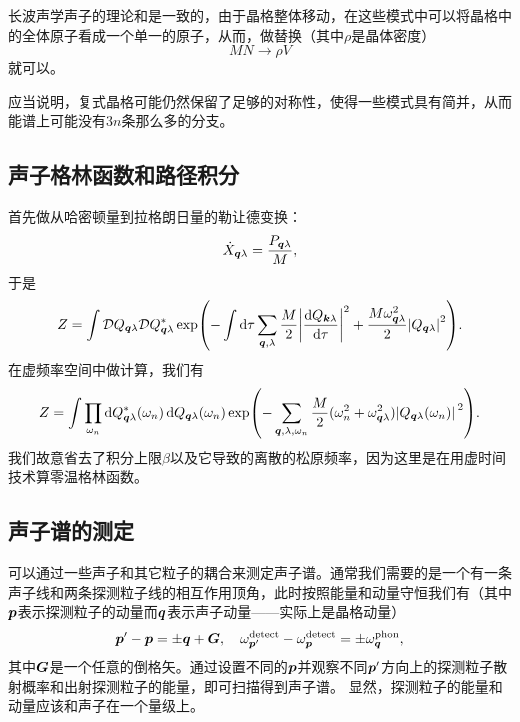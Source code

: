 长波声学声子的理论和是一致的，由于晶格整体移动，在这些模式中可以将晶格中的全体原子看成一个单一的原子，从而，做替换（其中$\rho$是晶体密度）
\begin{equation}
    MN \longrightarrow \rho V
\end{equation}
就可以。

应当说明，复式晶格可能仍然保留了足够的对称性，使得一些模式具有简并，从而能谱上可能没有$3n$条那么多的分支。

\subsection{声子格林函数和路径积分}

首先做从哈密顿量到拉格朗日量的勒让德变换：
\[
    \dot{X}_{\vb*{q} \lambda} = \frac{P_{\vb*{q} \lambda}}{M},
\]
于是
\begin{equation}
    Z = \int \mathcal{D} Q_{\vb*{q} \lambda} \mathcal{D} Q^*_{\vb*{q} \lambda} \exp(- \int \dd{\tau} \sum_{\vb*{q}, \lambda} \frac{M}{2} \abs{\dv{Q_{\vb*{k} \lambda}}{\tau}}^2 + \frac{M \omega_{\vb*{q} \lambda}^2}{2} \abs{Q_{\vb*{q} \lambda}}^2 ).
\end{equation}
在虚频率空间中做计算，我们有
\begin{equation}
    Z = \int \prod_{\omega_n} \dd{Q_{\vb*{q} \lambda}^*(\omega_n)} \dd{Q_{\vb*{q} \lambda}(\omega_n)} \exp(- \sum_{\vb*{q}, \lambda, \omega_n} \frac{M}{2} (\omega_n^2 + \omega_{\vb*{q} \lambda}^2) \abs*{Q_{\vb*{q} \lambda}(\omega_n)}^2).
\end{equation}
我们故意省去了积分上限$\beta$以及它导致的离散的松原频率，因为这里是在用虚时间技术算零温格林函数。

\subsection{声子谱的测定}

可以通过一些声子和其它粒子的耦合来测定声子谱。通常我们需要的是一个有一条声子线和两条探测粒子线的相互作用顶角，此时按照能量和动量守恒我们有（其中$\vb*{p}$表示探测粒子的动量而$\vb*{q}$表示声子动量——实际上是晶格动量）
\begin{equation}
    \vb*{p}' - \vb*{p} = \pm \vb*{q} + \vb*{G}, \quad \omega^\text{detect}_{\vb*{p}'} - \omega^\text{detect}_{\vb*{p}} = \pm \omega^\text{phon}_{\vb*{q}},
\end{equation}
其中$\vb*{G}$是一个任意的倒格矢。通过设置不同的$\vb*{p}$并观察不同$\vb*{p}'$方向上的探测粒子散射概率和出射探测粒子的能量，即可扫描得到声子谱。
显然，探测粒子的能量和动量应该和声子在一个量级上。

